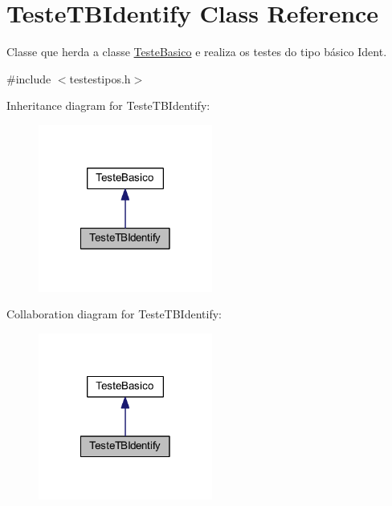 \hypertarget{class_teste_t_b_identify}{\section{Teste\-T\-B\-Identify Class Reference}
\label{class_teste_t_b_identify}
}


Classe que herda a classe \hyperlink{class_teste_basico}{Teste\-Basico} e realiza os testes do tipo básico Ident.  




{\ttfamily \#include $<$testestipos.\-h$>$}



Inheritance diagram for Teste\-T\-B\-Identify\-:\nopagebreak
\begin{figure}[H]
\begin{center}
\leavevmode
\includegraphics[width=162pt]{class_teste_t_b_identify__inherit__graph}
\end{center}
\end{figure}


Collaboration diagram for Teste\-T\-B\-Identify\-:\nopagebreak
\begin{figure}[H]
\begin{center}
\leavevmode
\includegraphics[width=162pt]{class_teste_t_b_identify__coll__graph}
\end{center}
\end{figure}
